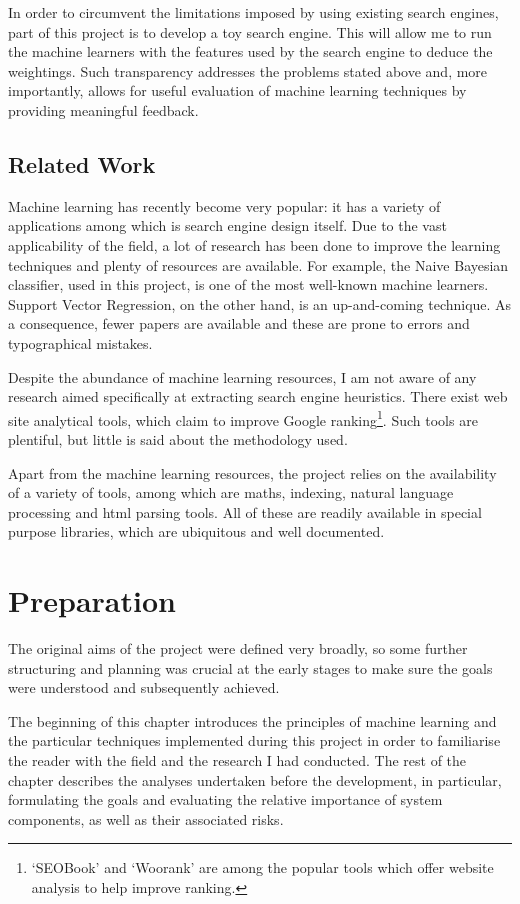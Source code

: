 \documentclass[12pt,a4paper,notitlepage,twoside]{scrbook}
\begin{document}
In order to circumvent the limitations imposed by using existing search engines, part of
this project is to develop a toy search engine. This will allow me to run the machine
learners with the features used by the search engine to deduce the weightings. Such
transparency addresses the problems stated above and, more importantly, allows for useful
evaluation of machine learning techniques by providing meaningful feedback. 

\section{Related Work}
Machine learning has recently become very popular: it has a variety of applications among
which is search engine design itself. Due to the vast applicability of the field, a lot of
research has been done to improve the learning techniques and plenty of resources are
available. For example, the Naive Bayesian classifier, used in this project, is one of the
most well-known machine learners. Support Vector Regression, on the other hand, is an
up-and-coming technique. As a consequence, fewer papers are available and these are prone
to errors and typographical mistakes.

Despite the abundance of machine learning resources, I am not aware of any research
aimed specifically at extracting search engine heuristics. There exist web
site analytical tools, which claim to improve Google ranking\footnote{`SEOBook' and
	`Woorank' are among the popular tools which offer website analysis to help improve
ranking.}. Such tools are plentiful, but little is said about the methodology used. 

Apart from the machine learning resources, the project relies on the availability of a variety of
tools, among which are maths, indexing, natural language processing and html parsing tools. All of
these are readily available in special purpose libraries, which are ubiquitous and well
documented.

\chapter{Preparation}
The original aims of the project were defined very broadly, so some further structuring and
planning was crucial at the early stages to make sure the goals were understood and
subsequently achieved.

The beginning of this chapter introduces the principles of machine learning and the
particular techniques implemented during this project in order to familiarise the reader
with the field and the research I had conducted.  The rest of the chapter describes the
analyses undertaken before the development, in particular, formulating the goals and
evaluating the relative importance of system components, as well as their associated
risks. 
\end{document}
